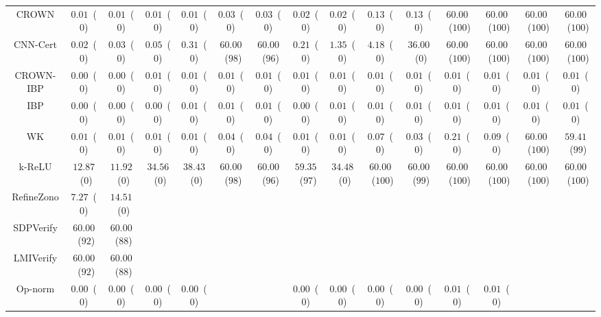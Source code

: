 \begin{table*}
{\begin{tabular}{c|c|c|c|c|c|c|c|c|c|c|c|c|c|c}
        CROWN &  $0.01$~($0$) &  $0.01$~($0$) &  $0.01$~($0$) &  $0.01$~($0$) &  $0.03$~($0$) &  $0.03$~($0$) &  $0.02$~($0$) &  $0.02$~($0$) &  $0.13$~($0$) &  $0.13$~($0$) & $60.00$~($100$) & $60.00$~($100$) & $60.00$~($100$) & $60.00$~($100$) \\
     CNN-Cert &  $0.02$~($0$) &  $0.03$~($0$) &  $0.05$~($0$) &  $0.31$~($0$) & $60.00$~($98$) & $60.00$~($96$) &  $0.21$~($0$) &  $1.35$~($0$) &  $4.18$~($0$) & $36.00$~($0$) & $60.00$~($100$) & $60.00$~($100$) & $60.00$~($100$) & $60.00$~($100$) \\
    CROWN-IBP &  $0.00$~($0$) &  $0.00$~($0$) &  $0.01$~($0$) &  $0.01$~($0$) &  $0.01$~($0$) &  $0.01$~($0$) &  $0.01$~($0$) &  $0.01$~($0$) &  $0.01$~($0$) &  $0.01$~($0$) &  $0.01$~($0$) &  $0.01$~($0$) &  $0.01$~($0$) &  $0.01$~($0$) \\
          IBP &  $0.00$~($0$) &  $0.00$~($0$) &  $0.00$~($0$) &  $0.01$~($0$) &  $0.01$~($0$) &  $0.01$~($0$) &  $0.00$~($0$) &  $0.01$~($0$) &  $0.01$~($0$) &  $0.01$~($0$) &  $0.01$~($0$) &  $0.01$~($0$) &  $0.01$~($0$) &  $0.01$~($0$) \\
           WK &  $0.01$~($0$) &  $0.01$~($0$) &  $0.01$~($0$) &  $0.01$~($0$) &  $0.04$~($0$) &  $0.04$~($0$) &  $0.01$~($0$) &  $0.01$~($0$) &  $0.07$~($0$) &  $0.03$~($0$) &  $0.21$~($0$) &  $0.09$~($0$) & $60.00$~($100$) & $59.41$~($99$) \\
       k-ReLU & $12.87$~($0$) & $11.92$~($0$) & $34.56$~($0$) & $38.43$~($0$) & $60.00$~($98$) & $60.00$~($96$) & $59.35$~($97$) & $34.48$~($0$) & $60.00$~($100$) & $60.00$~($99$) & $60.00$~($100$) & $60.00$~($100$) & $60.00$~($100$) & $60.00$~($100$) \\
   RefineZono &  $7.27$~($0$) & $14.51$~($0$) &               &               &               &               &               &               &               &               &               &               &               &               \\
    SDPVerify & $60.00$~($92$) & $60.00$~($88$) &               &               &               &               &               &               &               &               &               &               &               &               \\
    LMIVerify & $60.00$~($92$) & $60.00$~($88$) &               &               &               &               &               &               &               &               &               &               &               &               \\
      Op-norm &  $0.00$~($0$) &  $0.00$~($0$) &  $0.00$~($0$) &  $0.00$~($0$) &               &               &  $0.00$~($0$) &  $0.00$~($0$) &  $0.00$~($0$) &  $0.00$~($0$) &  $0.01$~($0$) &  $0.01$~($0$) &               &               \\

\end{tabular}}
\end{table*}
